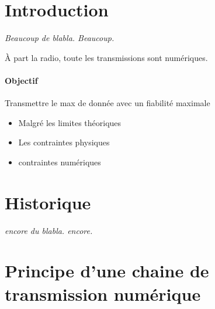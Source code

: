 \documentclass[main.tex]{subfiles}
\begin{document}
\section{Introduction}

\emph{Beaucoup de blabla. Beaucoup.}

À part la radio, toute les transmissions sont numériques.
\paragraph{Objectif}
Transmettre le max de donnée avec un fiabilité maximale
\begin{itemize}
\item Malgré les limites théoriques
\item Les contraintes physiques
\item contraintes numériques
\end{itemize}

\section{Historique}
\emph{encore du blabla. encore. }
\section{Principe d'une chaine de transmission numérique}
\end{document}

